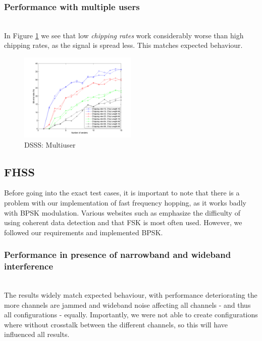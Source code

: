 		\subsubsection{Performance with multiple users}~\\
				
			In Figure \ref{fig:dsss_multiuser} we see that low \emph{chipping rates} work considerably worse than high chipping rates, as the signal is spread less.
			This matches expected behaviour.
				
			\begin{figure}[H]
			\centering
				\includegraphics[width=0.5\textwidth]{imgs/results/plot_mode_dsss-test_numSenders-rep_20-dataRate_8-dataLength_128.png}
				\caption{DSSS: Multiuser}
				\label{fig:dsss_multiuser}
			\end{figure}
	
	\subsection{FHSS}
		
		Before going into the exact test cases, it is important to note that there is a problem with our implementation of fast frequency hopping, as it works badly with BPSK modulation. Various websites such as \cite{web-nl} emphasize the difficulty of using coherent data detection and that FSK is most often used. However, we followed our requirements and implemented BPSK.
		
		\subsubsection{Performance in presence of narrowband and wideband interference}~\\
			The results widely match expected behaviour, with performance deteriorating the more channels are jammed and wideband noise affecting all channels - and thus all configurations - equally.
			Importantly, we were not able to create configurations where without crosstalk between the different channels, so this will have influenced all results.
			
